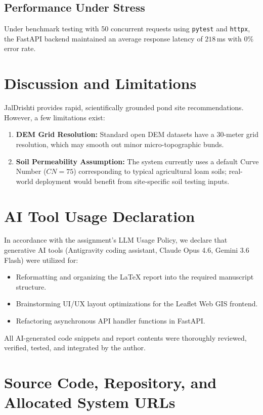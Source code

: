 \documentclass[11pt,a4paper]{article}
\begin{document}
\subsection{Performance Under Stress}
Under benchmark testing with 50 concurrent requests using \texttt{pytest} and \texttt{httpx}, the FastAPI backend maintained an average response latency of $218$\,ms with $0\%$ error rate.

\section{Discussion and Limitations}
\label{sec:discussion}
JalDrishti provides rapid, scientifically grounded pond site recommendations. However, a few limitations exist:
\begin{enumerate}
    \item \textbf{DEM Grid Resolution:} Standard open DEM datasets have a 30-meter grid resolution, which may smooth out minor micro-topographic bunds.
    \item \textbf{Soil Permeability Assumption:} The system currently uses a default Curve Number ($CN=75$) corresponding to typical agricultural loam soils; real-world deployment would benefit from site-specific soil testing inputs.
\end{enumerate}

\section{AI Tool Usage Declaration}
\label{sec:ai-usage}
In accordance with the assignment's LLM Usage Policy, we declare that generative AI tools (Antigravity coding assistant, Claude Opus 4.6, Gemini 3.6 Flash) were utilized for:
\begin{itemize}
    \item Reformatting and organizing the LaTeX report into the required manuscript structure.
    \item Brainstorming UI/UX layout optimizations for the Leaflet Web GIS frontend.
    \item Refactoring asynchronous API handler functions in FastAPI.
\end{itemize}
All AI-generated code snippets and report contents were thoroughly reviewed, verified, tested, and integrated by the author.

\appendix
\section{Source Code, Repository, and Allocated System URLs}
\label{sec:appendix}
\end{document}
